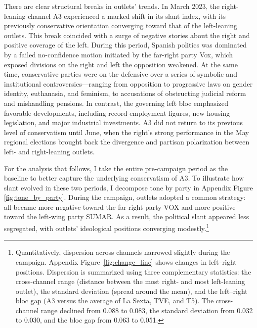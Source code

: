 \documentclass[12pt]{article}
\begin{document}
There are clear structural breaks in outlets’ trends. In March 2023, the right-leaning channel A3 experienced a marked shift in its slant index, with its previously conservative orientation converging toward that of the left-leaning outlets. This break coincided with a surge of negative stories about the right and positive coverage of the left. During this period, Spanish politics was dominated by a failed no-confidence motion initiated by the far-right party Vox, which exposed divisions on the right and left the opposition weakened. At the same time, conservative parties were on the defensive over a series of symbolic and institutional controversies—ranging from opposition to progressive laws on gender identity, euthanasia, and feminism, to accusations of obstructing judicial reform and mishandling pensions. In contrast, the governing left bloc emphasized favorable developments, including record employment figures, new housing legislation, and major industrial investments. A3 did not return to its previous level of conservatism until June, when the right’s strong performance in the May regional elections brought back the  divergence and partisan polarization between left- and right-leaning outlets.


 For the analysis that follows, I take the entire pre-campaign period as the baseline to better capture the underlying conservatism of A3. To illustrate how slant evolved in these two periods, I decompose tone by party in Appendix Figure \ref{fig:tone_by_party}. During the campaign, outlets adopted a common strategy: all became more negative toward the far-right party VOX and more positive toward the left-wing party SUMAR. As a result, the political slant appeared less segregated, with outlets’ ideological positions converging modestly.\footnote{ Quantitatively, dispersion across channels narrowed slightly during the campaign. Appendix Figure~\ref{fig:change_line} shows changes in left–right positions. Dispersion is summarized using three complementary statistics: the cross-channel range (distance between the most right- and most left-leaning outlet), the standard deviation (spread around the mean), and the left–right bloc gap (A3 versus the average of La Sexta, TVE, and T5). The cross-channel range declined from 0.088 to 0.083, the standard deviation from 0.032 to 0.030, and the bloc gap from 0.063 to 0.051.}
\end{document}
